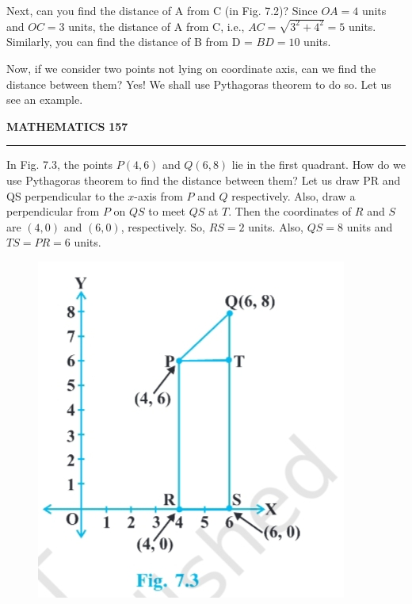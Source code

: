 \documentclass[11pt]{article}
\begin{document}
Next, can you find the distance of A from C (in Fig. 7.2)? Since \(OA = 4\) units and \(OC = 3\) units, the distance of A from C, i.e., \(AC = \sqrt{3^2 + 4^2} = 5\) units. Similarly, you can find the distance of B from D = \(BD = 10\) units.

Now, if we consider two points not lying on coordinate axis, can we find the distance between them? Yes! We shall use Pythagoras theorem to do so. Let us see an example.

\vspace{8em}
{\color{ncertblue}\textbf{MATHEMATICS}} \hfill \textbf{157}
{\color{ncertblue}\noindent\rule{\textwidth}{0.5pt}}

In Fig. 7.3, the points \(P(4, 6)\) and \(Q(6, 8)\) lie in the first quadrant. How do we use Pythagoras theorem to find the distance between them? Let us draw PR and QS perpendicular to the \(x\)-axis from \(P\) and \(Q\) respectively. Also, draw a perpendicular from \(P\) on \(QS\) to meet \(QS\) at \(T\). Then the coordinates of \(R\) and \(S\) are \((4, 0)\) and \((6, 0)\), respectively. So, \(RS = 2\) units. Also, \(QS = 8\) units and \(TS = PR = 6\) units.

\begin{figure}
    \centering
    \vspace{-1em}
    \includegraphics[width=\linewidth]{suk.png}
    \vspace{-1em}
\end{figure}
\end{document}

